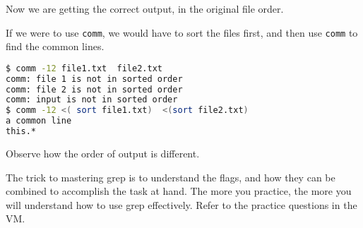 Now we are getting the correct output, in the original file order.

If we were to use \lstinline|comm|, we would have to sort the files first, and then use \lstinline|comm| to find the common lines.

\begin{lstlisting}[language=bash]
$ comm -12 file1.txt  file2.txt
comm: file 1 is not in sorted order
comm: file 2 is not in sorted order
comm: input is not in sorted order
$ comm -12 <( sort file1.txt)  <(sort file2.txt)
a common line
this.*
\end{lstlisting}

Observe how the order of output is different.

The trick to mastering grep is to understand the flags, and how they can be combined to accomplish the task at hand. The more you practice, the more you will understand how to use grep effectively. Refer to the practice questions in the VM.

